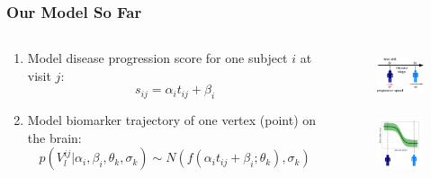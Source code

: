 \begin{frame}
\frametitle{Our Model So Far}

\begin{columns}[T]
    \begin{column}{.7\textwidth} %
   
     
   \begin{enumerate}      
      
      \item Model disease progression score for one subject $i$ at visit $j$:
      $$s_{ij} = \alpha_i t_{ij} + \beta_i$$
      
      \vspace{1em}
      
      \item Model biomarker trajectory of one vertex (point) on the brain:
      $$p(V_l^{ij} | \alpha_i, \beta_i, \theta_k, \sigma_k) \sim N(f(\alpha_i t_{ij} + \beta_i ; \theta_k), \sigma_k)$$
      
  
     
     \end{enumerate}
     

    \end{column}
    \begin{column}{.3\textwidth}

    \vspace{-2em}
    
    \begin{figure}
    \centering
    \includegraphics[height=1.5cm]{disease_axis.png}
    \end{figure}
    
    \begin{figure}
    \centering
    \includegraphics[height=1.5cm, trim=120 0 120 0]{Disease_progression_one_sigmoid_confidence.png}
    \end{figure}
    


\end{column}
\end{columns}
\end{frame}
